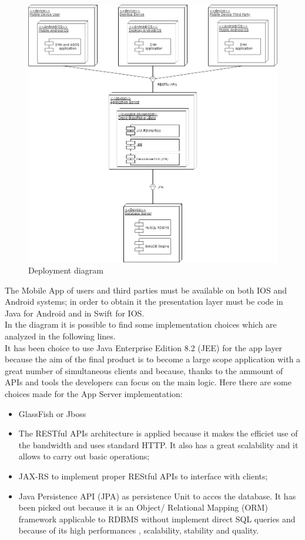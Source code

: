 \begin{figure}[h!]
	\includegraphics[width=1.0\textwidth]{./pictures/deployment_diagram.png}\par
	\caption{Deployment diagram}
\end{figure}
\FloatBarrier The Mobile App of users and third parties must be available on both IOS and Android systems; in order to obtain it the presentation layer must be code in Java for Android and in Swift for IOS.\\
In the diagram it is possible to find some implementation choices which are analyzed in the following lines.\\
It has been choice to use Java Enterprise Edition 8.2 (JEE) for the app layer because the aim of the final product is to become a large scope application with a great number of simultaneous clients and because, thanks to the ammount of APIs and tools the developers can focus on the main logic.
Here there are some choices made for the App Server implementation:
\begin{itemize}
	\item GlassFish or Jboss %
	\item The RESTful APIs architecture is applied because it makes the efficiet use of the bandwidth and uses standard HTTP. It 			also has a great scalability and it allows to carry out basic operations;
	\item JAX-RS to implement proper REStful APIs to interface with clients;
	\item Java Persistence API (JPA) as persistence Unit to acces the database. It has been picked out because it is an Object/			Relational Mapping (ORM) framework applicable to RDBMS without implement direct SQL queries and because of its high 				performances , scalability, stability and quality.
\end{itemize}
